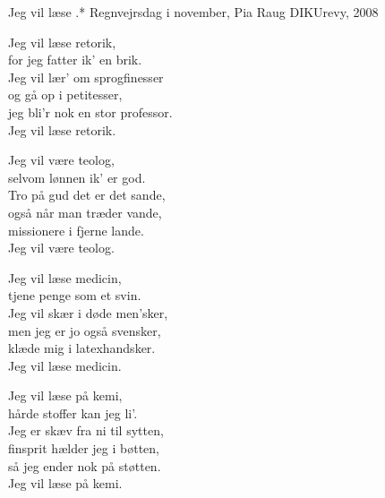 \begin{song}{Jeg vil læse .*}
  {} %
  {Regnvejrsdag i november, Pia Raug} %
  {} %
  {DIKUrevy, 2008} %
  {\NotCCLIed} %

  \begin{SBVerse}
    Jeg vil læse retorik,\\
    for jeg fatter ik' en brik.\\
    Jeg vil lær' om sprogfinesser\\
    og gå op i petitesser,\\
    jeg bli'r nok en stor professor.\\
    Jeg vil læse retorik.
  \end{SBVerse}

  \begin{SBVerse}
    Jeg vil være teolog,\\
    selvom lønnen ik' er god.\\
    Tro på gud det er det sande,\\
    også når man træder vande,\\
    missionere i fjerne lande.\\
    Jeg vil være teolog.
  \end{SBVerse}

  \begin{SBVerse}
    Jeg vil læse medicin,\\
    tjene penge som et svin.\\
    Jeg vil skær i døde men'sker,\\
    men jeg er jo også svensker,\\
    klæde mig i latexhandsker.\\
    Jeg vil læse medicin.
  \end{SBVerse}

  \begin{SBVerse}
    Jeg vil læse på kemi,\\
    hårde stoffer kan jeg li'.\\
    Jeg er skæv fra ni til sytten,\\
    finsprit hælder jeg i bøtten,\\
    så jeg ender nok på støtten.\\
    Jeg vil læse på kemi.
  \end{SBVerse}


\end{song}
